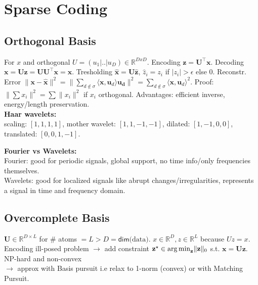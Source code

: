 \section{Sparse Coding}

\subsection*{Orthogonal Basis}
For $x$ and orthogonal $U = (u_1|..|u_{D}) \in \mathbb{R}^{DxD}$. 
Encoding $\mathbf{z = U^\top x}$. 
Decoding $\mathbf{x = U z = UU^\top x  = x }$.
Tresholding $ \mathbf{\hat{x}} = \mathbf{U\hat{z}}$, $\hat{z}_i = z_i$ if $ \lvert z_i \rvert > \epsilon$ else 0. 
Reconstr. Error $\|\mathbf{x}-\mathbf{\hat{x}}\|^2 = \|\sum_{d\notin\sigma}\langle\mathbf{x},\mathbf{u}_d\rangle \mathbf{u_d} \|^2 =  \sum_{d\notin\sigma}\langle\mathbf{x},\mathbf{u}_d\rangle ^2$. Proof: $\|\sum x_i \|^2 = \sum \|x_i \|^2$ if $x_i$ orthogonal. Advantages: efficient inverse, energy/length preservation. \\
\textbf{Haar wavelets:} \\
scaling: $[1,1,1,1]$, mother wavelet: $[1,1,-1,-1]$, dilated: $[1,-1,0,0]$, translated: $[0,0,1,-1]$.

\textbf{Fourier vs Wavelets:}\\
\textbullet Fourier: good for periodic signals, global support, no time info/only frequencies themselves. \\
\textbullet Wavelets: good for localized signals like abrupt changes/irregularities, represents a signal in time and frequency domain. 

\subsection*{Overcomplete Basis}
$\mathbf{U} \in \mathbb{R}^{D \times  L}$ for \# atoms $ = L > D = \mathsf{dim}\text{(data)}$. $x \in \mathbb{R}^D, z \in \mathbb{R}^L$ because $Uz=x$.
Encoding ill-posed problem $\rightarrow$ add constraint $\mathbf{z}^\star \in \operatorname*{arg\,min}_\mathbf{z} \lVert \mathbf{z} \rVert_0$ s.t. $\mathbf{x} = \mathbf{Uz}$. NP-hard and non-convex \\ $\rightarrow$ approx with Basis pursuit i.e relax to 1-norm (convex) or with Matching Pursuit.

